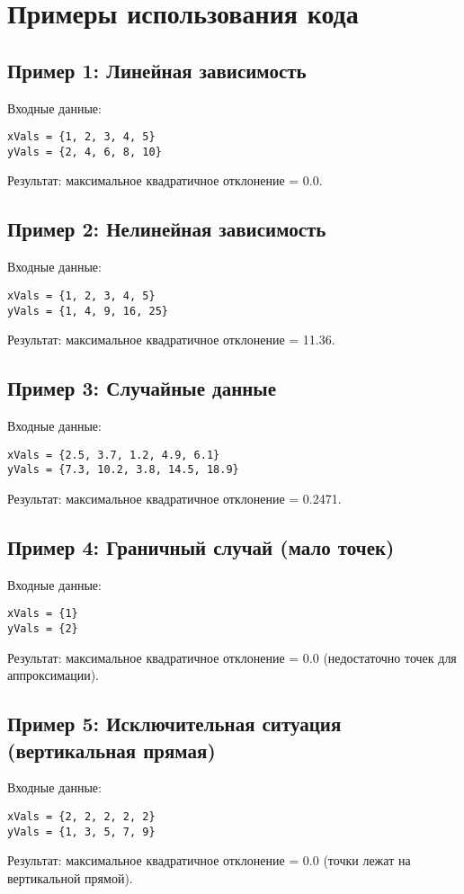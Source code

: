 \section{Примеры использования кода}

\subsection{Пример 1: Линейная зависимость}
Входные данные:
\begin{lstlisting}
xVals = {1, 2, 3, 4, 5}
yVals = {2, 4, 6, 8, 10}
\end{lstlisting}
Результат: максимальное квадратичное отклонение = 0.0.

\subsection{Пример 2: Нелинейная зависимость}
Входные данные:
\begin{lstlisting}
xVals = {1, 2, 3, 4, 5}
yVals = {1, 4, 9, 16, 25}
\end{lstlisting}
Результат: максимальное квадратичное отклонение = 11.36.

\subsection{Пример 3: Случайные данные}
Входные данные:
\begin{lstlisting}
xVals = {2.5, 3.7, 1.2, 4.9, 6.1}
yVals = {7.3, 10.2, 3.8, 14.5, 18.9}
\end{lstlisting}
Результат: максимальное квадратичное отклонение = 0.2471.

\subsection{Пример 4: Граничный случай (мало точек)}
Входные данные:
\begin{lstlisting}
xVals = {1}
yVals = {2}
\end{lstlisting}
Результат: максимальное квадратичное отклонение = 0.0 (недостаточно точек для аппроксимации).

\subsection{Пример 5: Исключительная ситуация (вертикальная прямая)}
Входные данные:
\begin{lstlisting}
xVals = {2, 2, 2, 2, 2}
yVals = {1, 3, 5, 7, 9}
\end{lstlisting}
Результат: максимальное квадратичное отклонение = 0.0 (точки лежат на вертикальной прямой).
